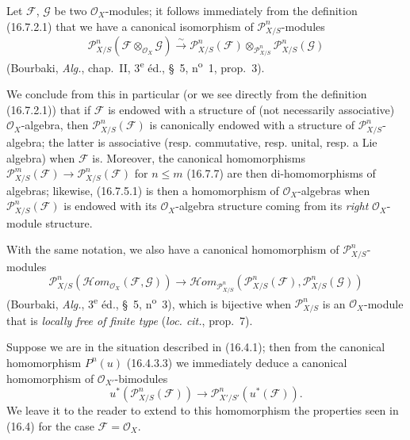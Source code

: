 \begin{env}[16.7.8]
\label{IV.16.7.8}
Let $\mathscr{F}$, $\mathscr{G}$ be two $\mathcal{O}_X$-modules; it follows
immediately from the definition (16.7.2.1) that we have a canonical
isomorphism of $\mathscr{P}_{X/S}^n$-modules
\[
  \mathscr{P}_{X/S}^n(\mathscr{F}\otimes_{\mathcal{O}_X}\mathscr{G})
  \xrightarrow{\sim}
  \mathscr{P}_{X/S}^n(\mathscr{F})
  \otimes_{\mathscr{P}_{X/S}^n}\mathscr{P}_{X/S}^n(\mathscr{G})
  \tag{16.7.8.1}
  \label{IV.16.7.8.1}
\]
(Bourbaki, \emph{Alg.}, chap.~II, 3\textsuperscript{e} éd., §~5,
n\textsuperscript{o}~1, prop.~3).

We conclude from this in particular (or we see directly from the definition
(16.7.2.1)) that if $\mathscr{F}$ is endowed with a structure of
(not necessarily associative) $\mathcal{O}_X$-algebra, then
$\mathscr{P}_{X/S}^n(\mathscr{F})$ is canonically endowed with a structure of
$\mathscr{P}_{X/S}^n$-algebra; the latter is associative (resp.
commutative, resp. unital, resp. a Lie algebra) when $\mathscr{F}$ is.
Moreover, the canonical homomorphisms
$\mathscr{P}_{X/S}^m(\mathscr{F})\to\mathscr{P}_{X/S}^n(\mathscr{F})$ for
$n\leq m$ (16.7.7) are then di-homomorphisms of algebras; likewise,
(16.7.5.1) is then a homomorphism of $\mathcal{O}_X$-algebras when
$\mathscr{P}_{X/S}^n(\mathscr{F})$ is endowed with its
$\mathcal{O}_X$-algebra structure coming from its \emph{right}
$\mathcal{O}_X$-module structure.

With the same notation, we also have a canonical homomorphism of
$\mathscr{P}_{X/S}^n$-modules
\[
  \mathscr{P}_{X/S}^n
  (\mathscr{H}\!om_{\mathcal{O}_X}(\mathscr{F},\mathscr{G}))
  \longrightarrow
  \mathscr{H}\!om_{\mathscr{P}_{X/S}^n}
  (\mathscr{P}_{X/S}^n(\mathscr{F}),\mathscr{P}_{X/S}^n(\mathscr{G}))
  \tag{16.7.8.2}
  \label{IV.16.7.8.2}
\]
(Bourbaki, \emph{Alg.}, 3\textsuperscript{e} éd., §~5,
n\textsuperscript{o}~3), which is bijective when $\mathscr{P}_{X/S}^n$ is
an $\mathcal{O}_X$-module that is \emph{locally free of finite type}
(\emph{loc. cit.}, prop.~7).
\end{env}

\begin{env}[16.7.9]
\label{IV.16.7.9}
Suppose we are in the situation described in (16.4.1); then from the
canonical homomorphism $P^n(u)$ (16.4.3.3) we immediately deduce a
canonical homomorphism of $\mathcal{O}_{X'}$-bimodules
\[
  u^*(\mathscr{P}_{X/S}^n(\mathscr{F}))
  \longrightarrow
  \mathscr{P}_{X'/S'}^n(u^*(\mathscr{F})).
  \tag{16.7.9.1}
  \label{IV.16.7.9.1}
\]
We leave it to the reader to extend to this homomorphism the properties
seen in (16.4) for the case $\mathscr{F}=\mathcal{O}_X$.
\end{env}

